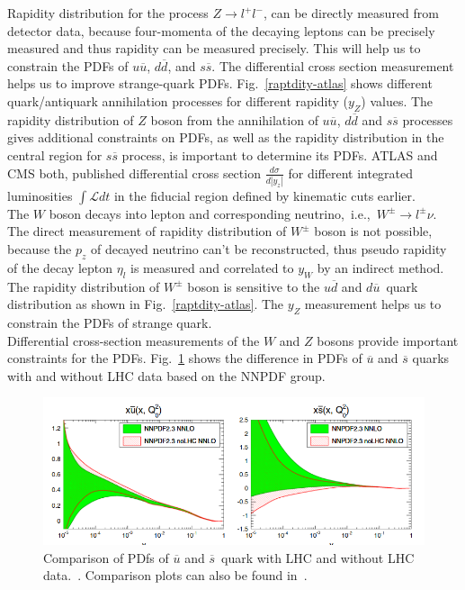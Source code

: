 Rapidity distribution for the process $Z\rightarrow l^{+}l^{-}$, can be directly measured from  detector data, because  four-momenta of the decaying leptons can be precisely measured and thus rapidity can be measured precisely. This will help us to constrain the PDFs of $u\overline{u}$, $d\overline{d}$, and $s\overline{s}$. The differential cross section measurement helps us to improve strange-quark PDFs. Fig.~\ref{raptdity-atlas} shows different quark/antiquark annihilation processes for different rapidity ($y_{Z}$) values.  The rapidity distribution of $Z$ boson from the annihilation of $u\overline{u}$, $d\overline{d}$ and $s\overline{s}$ processes gives additional constraints on PDFs, as well as the rapidity distribution in the central region for $s\overline{s}$ process, is important to determine its PDFs. 
ATLAS and CMS both, published differential cross section $\frac{d\sigma}{d|y_{z}|}$ for different integrated luminosities $\int\mathcal{L}dt$ in the fiducial region defined by kinematic cuts earlier.\\
The $W$ boson decays into lepton and corresponding neutrino,~i.e.,~$W^{\pm}\rightarrow l^{\pm}\nu$. The direct measurement of rapidity distribution of $W^{\pm}$ boson is not possible, because the $p_{z}$ of decayed neutrino can't be reconstructed, thus pseudo rapidity of the decay lepton $\eta_{l}$ is measured and correlated to $y_{W}$ by an indirect method.
The rapidity distribution of $W^{\pm}$ boson is sensitive to the $u\overline{d}$ and $d\overline{u}$~quark distribution as shown in Fig.~\ref{raptdity-atlas}. The $y_{Z}$ measurement helps us to constrain the PDFs of strange quark.\\
Differential cross-section measurements of the $W$ and $Z$ bosons provide important constraints for the PDFs. Fig.~\ref{ubsr-sbsr} shows the difference in  PDFs of $\overline{u}$ and $\overline{s}$ quarks with and without LHC data based on the NNPDF group.
\begin{figure}[H]
\centering
\includegraphics[scale=0.5]{chapter3/strange-quark.png}
\caption{Comparison of PDfs of $\overline{u}$ and $\overline{s}$~quark with LHC and without LHC data.~\cite{Schott_2014}. Comparison plots can also be found in~\cite{Ball_2013}.}
\label{ubsr-sbsr}
\end{figure}

